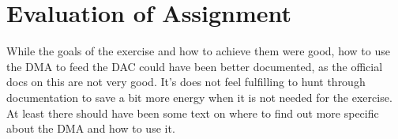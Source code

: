 \section{Evaluation of Assignment}
While the goals of the exercise and how to achieve them were good, how to use the DMA to feed the DAC could have been better documented, as the official docs on this are not very good.
It's does not feel fulfilling to hunt through documentation to save a bit more energy when it is not needed for the exercise. 
At least there should have been some text on where to find out more specific about the DMA and how to use it.
